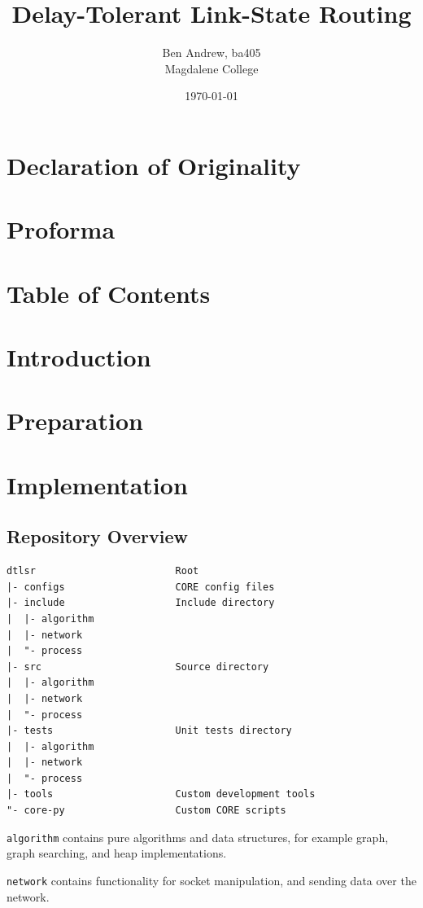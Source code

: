 \documentclass[10pt,twoside,a4paper]{article}
\title{Delay-Tolerant Link-State Routing}
\author{Ben Andrew, ba405\\Magdalene College}
\date{\today}
\begin{document}
\maketitle


\section{Declaration of Originality}

\section{Proforma}

\section{Table of Contents}

\section{Introduction}

\section{Preparation}

\section{Implementation}

\subsection{Repository Overview}

\begin{verbatim}
dtlsr                        Root
|- configs                   CORE config files
|- include                   Include directory
|  |- algorithm
|  |- network
|  "- process
|- src                       Source directory
|  |- algorithm
|  |- network
|  "- process
|- tests                     Unit tests directory
|  |- algorithm
|  |- network
|  "- process
|- tools                     Custom development tools
"- core-py                   Custom CORE scripts
\end{verbatim}

\texttt{algorithm} contains pure algorithms and data structures, for example graph, graph searching, and heap implementations.

\texttt{network} contains functionality for socket manipulation, and sending data over the network.
\end{document}
